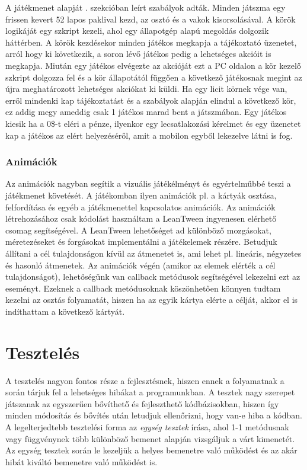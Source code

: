 \documentclass[]{thesis-ekf}
\theoremstyle{definition}
\theoremstyle{remark}
\begin{document}
A játékmenet alapját . szekcióban leírt szabályok adták. Minden játszma egy frissen kevert 52 lapos paklival kezd, az osztó és a vakok kisorsolásával. A körök logikáját egy szkript kezeli, ahol egy állapotgép alapú megoldás dolgozik háttérben. A körök kezdésekor minden játékos megkapja a tájékoztató üzenetet, arról hogy ki következik, a soron lévő játékos pedig a lehetséges akcióit is megkapja. Miután egy játékos elvégezte az akcióját ezt a PC oldalon a kör kezelő szkript dolgozza fel és a kör állapotától függően a következő játékosnak megint az újra meghatározott lehetséges akciókat ki küldi. Ha egy licit körnek vége van, erről mindenki kap tájékoztatást és a szabályok alapján elindul a következő kör, ez addig megy ameddig csak 1 játékos marad bent a játszmában. Egy játékos kiesik ha a 0\$-t eléri a pénze, ilyenkor egy lecsatlakozási kérelmet és egy üzenetet kap a játékos az elért helyezéséről, amit a mobilon egyből lekezelve látni is fog.

\subsection{Animációk}

Az animációk nagyban segítik a vizuális játékélményt és egyértelműbbé teszi a játékmenet követését. A játékomban ilyen animációk pl. a kártyák osztása, felfordítása és egyéb a játékmenettel kapcsolatos animációk. Az animációk létrehozásához csak kódolást használtam a LeanTween \cite{UnityLeanTween} ingyenesen elérhető csomag segítségével. A LeanTween lehetőséget ad különböző mozgásokat, méretezéseket és forgásokat implementálni a játékelemek részére. Betudjuk állítani a cél tulajdonságon kívül az átmenetet is, ami lehet pl. lineáris, négyzetes és hasonló átmenetek. Az animációk végén (amikor az elemek elérték a cél tulajdonságot), lehetőségünk van callback metódusok segítségével lekezelni ezt az eseményt. Ezeknek a callback metódusoknak köszönhetően könnyen tudtam kezelni az osztás folyamatát, hiszen ha az egyik kártya elérte a célját, akkor el is indíthattam a következő kártyát.

\chapter{Tesztelés}

A tesztelés nagyon fontos része a fejlesztésnek, hiszen ennek a folyamatnak a során tárjuk fel a lehetséges hibákat a programunkban. A tesztek nagy szerepet játszanak az egyszerűen bővíthető és fejleszthető kódbázisokban, hiszen így minden módosítás és bővítés után letudjuk ellenőrizni, hogy van-e hiba a kódban. A legelterjedtebb tesztelési forma az \emph{egység tesztek} írása, ahol 1-1 metódusnak vagy függvénynek több különböző bemenet alapján vizsgáljuk a várt kimenetét. Az egység tesztek során le kezeljük a helyes bemenetre való működést és az akár hibát kiváltó bemenetre való működést is. 
\end{document}
